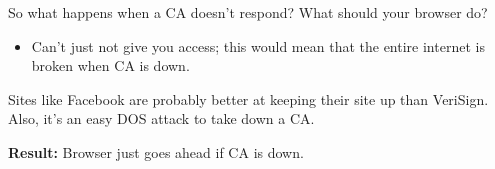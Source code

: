 So what happens when a CA doesn't respond? What should your browser do?
\begin{itemize}
    \item Can't just not give you access; this would mean that the entire internet is broken when CA is down.
\end{itemize}
Sites like Facebook are probably better at keeping their site up than VeriSign. Also, it's an easy DOS attack to take down a CA.

\textbf{Result:} Browser just goes ahead if CA is down.